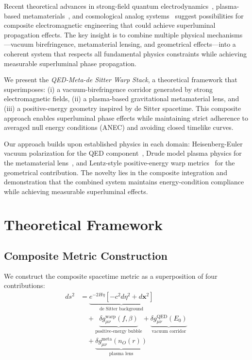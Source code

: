 \documentclass[aps,prl,reprint,groupedaddress]{revtex4-1}
\begin{document}
Recent theoretical advances in strong-field quantum electrodynamics~\cite{Heisenberg1936, Dittrich2000}, plasma-based metamaterials~\cite{Shvets2007}, and cosmological analog systems~\cite{Barcelo2005} suggest possibilities for composite electromagnetic engineering that could achieve superluminal propagation effects. The key insight is to combine multiple physical mechanisms—vacuum birefringence, metamaterial lensing, and geometrical effects—into a coherent system that respects all fundamental physics constraints while achieving measurable superluminal phase propagation.

We present the \textit{QED-Meta-de Sitter Warp Stack}, a theoretical framework that superimposes: (i) a vacuum-birefringence corridor generated by strong electromagnetic fields, (ii) a plasma-based gravitational metamaterial lens, and (iii) a positive-energy geometry inspired by de Sitter spacetime. This composite approach enables superluminal phase effects while maintaining strict adherence to averaged null energy conditions (ANEC) and avoiding closed timelike curves.

Our approach builds upon established physics in each domain: Heisenberg-Euler vacuum polarization for the QED component~\cite{Heisenberg1936}, Drude model plasma physics for the metamaterial lens~\cite{Shvets2007}, and Lentz-style positive-energy warp metrics~\cite{Lentz2021} for the geometrical contribution. The novelty lies in the composite integration and demonstration that the combined system maintains energy-condition compliance while achieving measurable superluminal effects.

\section{Theoretical Framework}

\subsection{Composite Metric Construction}

We construct the composite spacetime metric as a superposition of four contributions:
\begin{align}
ds^2 &= \underbrace{e^{-2H\eta}[-c^2d\eta^2 + d\mathbf{x}^2]}_{\text{de Sitter background}} \nonumber \\
&\quad + \underbrace{\delta g_{\mu\nu}^{\text{warp}}(f,\beta)}_{\text{positive-energy bubble}} + \underbrace{\delta g_{\mu\nu}^{\text{QED}}(E_0)}_{\text{vacuum corridor}} \nonumber \\
&\quad + \underbrace{\delta g_{\mu\nu}^{\text{meta}}(n_O(r))}_{\text{plasma lens}}
\end{align}
\end{document}
